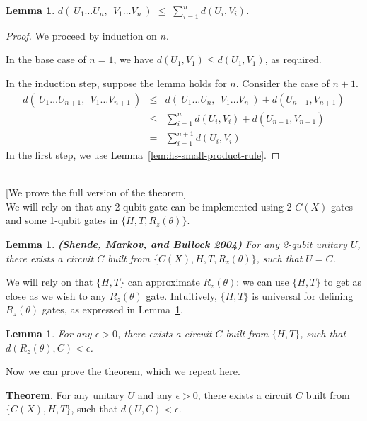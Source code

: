 \documentclass[11pt]{article}
\def\({\begin{eqnarray*}}
\def\){\end{eqnarray*}}
\newtheorem{lemma}[theorem]{Lemma}
\begin{document}
\begin{lemma}
$d(\ U_1 \ldots U_n,\ \ V_1 \ldots V_n\ ) \;\leq\; \sum_{i=1}^n d(U_i,V_i)$.
\label{lem:hs-big-product-rule}
\end{lemma}

\begin{proof}
We proceed by induction on $n$.

In the base case of $n=1$, we have $d(U_1,V_1) \leq d(U_1,V_1)$, as required.

In the induction step, suppose the lemma holds for $n$.
Consider the case of $n+1$.
\(
d(\ U_1 \ldots U_{n+1},\ \ V_1 \ldots V_{n+1}\ ) 
&\leq&
d(\ U_1 \ldots U_n,\ \ V_1 \ldots V_n\ ) + d(U_{n+1},V_{n+1}) 
\\ &\leq&
\sum_{i=1}^n d(U_i,V_i) + d(U_{n+1},V_{n+1})
\\ &=&
\sum_{i=1}^{n+1} d(U_i,V_i) 
\)
In the first step, we use Lemma~\ref{lem:hs-small-product-rule}.
\end{proof}

\newpage

\mbox{} \\ \hspace*{1cm}
   [We prove the full version of the theorem] \\
We will rely on that any 2-qubit gate can be implemented using 
2 $C(X)$ gates and some 1-qubit gates in $\{H, T, R_z(\theta)\}$.

\begin{lemma} {\bf (Shende, Markov, and Bullock 2004)}
For any 2-qubit unitary $U$,
there exists a circuit $C$ built from 
$\{C(X), H, T, R_z(\theta)\}$, 
such that $U = C$.
\label{lem:implementation-of-a-2-qubit-gate}
\end{lemma}

We will rely on that $\{H, T\}$ can approximate $R_z(\theta)$:
we can use $\{H, T\}$ to get as close as we wish to any $R_z(\theta)$ gate.
Intuitively, $\{H, T\}$ is universal for defining $R_z(\theta)$ gates,
as expressed in Lemma~\ref{lem:approximation-of-rz}.

\begin{lemma}
For any $\epsilon > 0$,
there exists a circuit $C$ built from $\{H, T\}$,
such that $d(R_z(\theta),C) < \epsilon$.
\label{lem:approximation-of-rz}
\end{lemma}

Now we can prove the theorem, which we repeat here.

\bigskip

\noindent
{\bf Theorem}.  For any unitary $U$ and any $\epsilon > 0$, 
there exists a circuit $C$ built from $\{C(X), H, T\}$,
such that $d(U,C) < \epsilon$.
\end{document}
